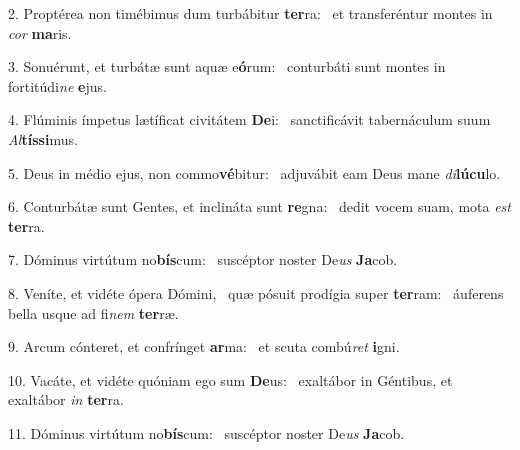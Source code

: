 2. Proptérea non timébimus dum turbábitur \textbf{ter}ra: \ast\  et transferéntur montes in \textit{cor} \textbf{ma}ris.\

3. Sonuérunt, et turbátæ sunt aquæ e\textbf{ó}rum: \ast\  conturbáti sunt montes in fortitúdi\textit{ne} \textbf{e}jus.\

4. Flúminis ímpetus lætíficat civitátem \textbf{De}i: \ast\  sanctificávit tabernáculum suum \textit{Al}\textbf{tís}\textbf{si}mus.\

5. Deus in médio ejus, non commo\textbf{vé}bitur: \ast\  adjuvábit eam Deus mane \textit{di}\textbf{lú}\textbf{cu}lo.\

6. Conturbátæ sunt Gentes, et inclináta sunt \textbf{re}gna: \ast\  dedit vocem suam, mota \textit{est} \textbf{ter}ra.\

7. Dóminus virtútum no\textbf{bís}cum: \ast\  suscéptor noster De\textit{us} \textbf{Ja}cob.\

8. Veníte, et vidéte ópera Dómini, \dag\  quæ pósuit prodígia super \textbf{ter}ram: \ast\  áuferens bella usque ad fi\textit{nem} \textbf{ter}ræ.\

9. Arcum cónteret, et confrínget \textbf{ar}ma: \ast\  et scuta combú\textit{ret} \textbf{i}gni.\

10. Vacáte, et vidéte quóniam ego sum \textbf{De}us: \ast\  exaltábor in Géntibus, et exaltábor \textit{in} \textbf{ter}ra.\

11. Dóminus virtútum no\textbf{bís}cum: \ast\  suscéptor noster De\textit{us} \textbf{Ja}cob.\

